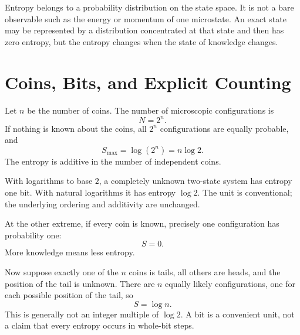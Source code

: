 Entropy belongs to a probability distribution on the state space. It is not
a bare observable such as the energy or momentum of one microstate. An exact
state may be represented by a distribution concentrated at that state and
then has zero entropy, but the entropy changes when the state of knowledge
changes.

\section{Coins, Bits, and Explicit Counting}

Let \(n\) be the number of coins. The number of microscopic configurations is
\begin{equation}
 N=2^n.
 \label{eq:sm1-coin-state-count}
\end{equation}
If nothing is known about the coins, all \(2^n\) configurations are equally
probable, and
\begin{equation}
 S_{\max}=\log(2^n)=n\log2.
 \label{eq:sm1-coin-max-entropy}
\end{equation}
The entropy is additive in the number of independent coins.

With logarithms to base \(2\), a completely unknown two-state system has
entropy one bit. With natural logarithms it has entropy \(\log2\). The unit
is conventional; the underlying ordering and additivity are unchanged.

At the other extreme, if every coin is known, precisely one configuration
has probability one:
\begin{equation}
 S=0.
\end{equation}
More knowledge means less entropy.

Now suppose exactly one of the \(n\) coins is tails, all others are heads,
and the position of the tail is unknown. There are \(n\) equally likely
configurations, one for each possible position of the tail, so
\begin{equation}
 S=\log n.
 \label{eq:sm1-one-tail-entropy}
\end{equation}
This is generally not an integer multiple of \(\log2\). A bit is a convenient
unit, not a claim that every entropy occurs in whole-bit steps.

\begin{classroomqa}
\end{classroomqa}

